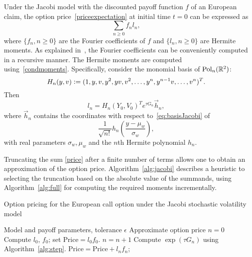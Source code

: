 Under the Jacobi model with the discounted payoff function $f$ of an European claim, 
the option price~\eqref{priceexpectation} at initial time $t=0$ can be expressed as 
\begin{equation}\label{price}
\sum_{n \geq 0} f_n l_n,
\end{equation}
where $\{f_n, n\geq 0\}$ are the Fourier coefficients of $f$ and $\{l_n, n\geq 0\}$ are Hermite moments. As explained in~\cite{ackerer2016jacobi}, the Fourier coefficients can be conveniently computed in a recursive manner. The Hermite moments are computed using~\eqref{condmoments}. Specifically,
consider the monomial basis of $\text{Pol}_n({\mathbb R}^2)$:
\begin{equation}\label{eq:basisJacobi}
H_n(y,v) \mathrel{\mathop:}= (1,y,v,y^2,yv,v^2,\dots,y^n,y^{n-1}v,\dots,v^n)^T.
\end{equation}
Then 
\begin{equation} \label{eq:hermitemoments}
l_n = H_n(Y_0,V_0)^Te^{\tau G_n} \vec{h}_n,
\end{equation}
where $\vec{h}_n$ contains the coordinates with respect to~\eqref{eq:basisJacobi} of 
\begin{equation*}
 \frac{1}{\sqrt{n!}} h_n \left(\frac{y-\mu_w}{\sigma_w}\right),
\end{equation*}
with real parameters $\sigma_w, \mu_w$ and the $n$th Hermite polynomial ${h}_n$.

Truncating the sum \eqref{price} after a finite number of terms allows
one to obtain an approximation of the option price.
Algorithm~\ref{alg:jacobi} describes a heuristic to selecting the truncation based on the absolute value of the summands, using Algorithm~\ref{alg:full} for computing the required moments incrementally. 
\begin{algorithm}[ht]
\caption{Option pricing for the European call option under the Jacobi stochastic volatility model}
\begin{algorithmic}[1]\label{alg:jacobi}
\REQUIRE Model and payoff parameters, tolerance $\epsilon$
\ENSURE Approximate option price
\STATE $n=0$
\STATE Compute $l_0$, $f_0$; set $\text{Price} = l_0 f_0$.
\STATE $n=n+1$
\STATE \label{line:jacobiexp} Compute $\exp(\tau G_n)$ using Algorithm~\ref{alg:step}.
\STATE {}
\STATE {}
\STATE $\text{Price}=\text{Price}+l_n f_n$;
\ENDWHILE
\end{algorithmic}
\end{algorithm}

